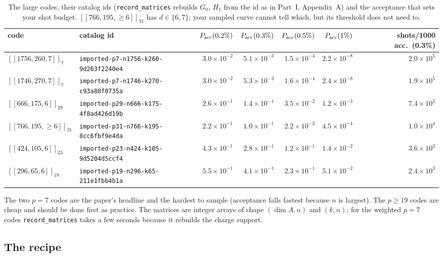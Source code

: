 \documentclass[11pt]{article}
\newcommand{\code}[1]{\texttt{#1}}
\begin{document}
\begin{table}[h]\centering\footnotesize
\begin{tabular}{llrrrrr}
\toprule
code & catalog id & $P_{\rm acc}(0.2\%)$ & $P_{\rm acc}(0.3\%)$ & $P_{\rm acc}(0.5\%)$ & $P_{\rm acc}(1\%)$ & shots/1000 acc.\ (0.3\%) \\
\midrule
\relax$[[1756,260,7]]_{7}$ & \code{imported-p7-n1756-k260-9d263f2240e4} & $3.0\times10^{-2}$ & $5.1\times10^{-3}$ & $1.5\times10^{-4}$ & $2.2\times10^{-8}$ & $2.0\times10^{5}$ \\
\relax$[[1746,270,7]]_{7}$ & \code{imported-p7-n1746-k270-c93a88f0735a} & $3.0\times10^{-2}$ & $5.3\times10^{-3}$ & $1.6\times10^{-4}$ & $2.4\times10^{-8}$ & $1.9\times10^{5}$ \\
\relax$[[666,175,6]]_{29}$ & \code{imported-p29-n666-k175-4f8ad426d19b} & $2.6\times10^{-1}$ & $1.4\times10^{-1}$ & $3.5\times10^{-2}$ & $1.2\times10^{-3}$ & $7.4\times10^{3}$ \\
\relax$[[766,195,{\ge}6]]_{31}$ & \code{imported-p31-n766-k195-8cc6fbf9e4da} & $2.2\times10^{-1}$ & $1.0\times10^{-1}$ & $2.2\times10^{-2}$ & $4.5\times10^{-4}$ & $1.0\times10^{4}$ \\
\relax$[[424,105,6]]_{23}$ & \code{imported-p23-n424-k105-9d5204d5ccf4} & $4.3\times10^{-1}$ & $2.8\times10^{-1}$ & $1.2\times10^{-1}$ & $1.4\times10^{-2}$ & $3.6\times10^{3}$ \\
\relax$[[296,65,6]]_{19}$ & \code{imported-p19-n296-k65-211e1fbb4b1a} & $5.5\times10^{-1}$ & $4.1\times10^{-1}$ & $2.3\times10^{-1}$ & $5.1\times10^{-2}$ & $2.4\times10^{3}$ \\
\bottomrule
\end{tabular}
\caption{The large codes, their catalog ids (\code{record\_matrices} rebuilds $G_0$,
$H_1$ from the id as in Part~I, Appendix~A) and the acceptance that sets your shot
budget. $[[766,195,{\ge}6]]_{31}$ has $d\in\{6,7\}$; your sampled curve cannot tell
which, but its threshold does not need to.}
\label{tab:large}
\end{table}

The two $p=7$ codes are the paper's headline and the hardest to sample (acceptance
falls fastest because $n$ is largest). The $p\ge19$ codes are cheap and should be
done first as practice. The matrices are integer arrays of shape
$(\dim A, n)$ and $(k, n)$; for the weighted $p=7$ codes \code{record\_matrices}
takes a few seconds because it rebuilds the charge support.

\subsection{The recipe}
\end{document}
